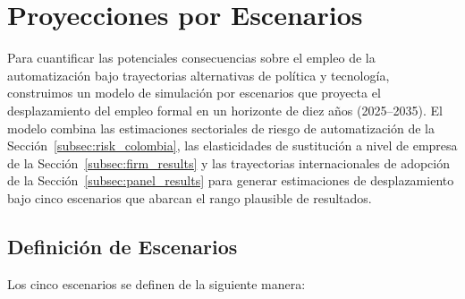 \documentclass{article}
\begin{document}
\FloatBarrier

\section{Proyecciones por Escenarios}
\label{sec:scenarios}

Para cuantificar las potenciales consecuencias sobre el empleo de la automatizaci\'on bajo trayectorias alternativas de pol\'itica y tecnolog\'ia, construimos un modelo de simulaci\'on por escenarios que proyecta el desplazamiento del empleo formal en un horizonte de diez a\~nos (2025--2035). El modelo combina las estimaciones sectoriales de riesgo de automatizaci\'on de la Secci\'on~\ref{subsec:risk_colombia}, las elasticidades de sustituci\'on a nivel de empresa de la Secci\'on~\ref{subsec:firm_results} y las trayectorias internacionales de adopci\'on de la Secci\'on~\ref{subsec:panel_results} para generar estimaciones de desplazamiento bajo cinco escenarios que abarcan el rango plausible de resultados.

\subsection{Definici\'on de Escenarios}
\label{subsec:scenario_definitions}

Los cinco escenarios se definen de la siguiente manera:
\end{document}
